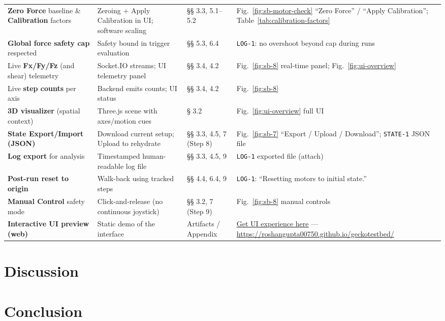 \documentclass[
    twocolumn,
    fontsize = 10pt,
    parskip = half+,
    headings = small,
    headwidth = text,
    footwidth = text,
]{scrartcl}
\begin{document}
\begin{table}[t]
\begin{tabularx}{\textwidth}{@{}p{}YYY@{}}
\textbf{Zero Force} baseline \& \textbf{Calibration} factors
& Zeroing + Apply Calibration in UI; software scaling
& §§ 3.3, 5.1–5.2
& Fig.~\ref{fig:sb-motor-check} “Zero Force” / “Apply Calibration”; Table~\ref{tab:calibration-factors} \\
\textbf{Global force safety cap} respected
& Safety bound in trigger evaluation
& §§ 5.3, 6.4
& \texttt{LOG-1}: no overshoot beyond cap during runs \\
Live \textbf{Fx/Fy/Fz} (and shear) telemetry
& Socket.IO streams; UI telemetry panel
& §§ 3.4, 4.2
& Fig.~\ref{fig:sb-8} real-time panel; Fig.~\ref{fig:ui-overview} \\
Live \textbf{step counts} per axis
& Backend emits counts; UI status
& §§ 3.4, 4.2
& Fig.~\ref{fig:sb-8} \\
\textbf{3D visualizer} (spatial context)
& Three.js scene with axes/motion cues
& § 3.2
& Fig.~\ref{fig:ui-overview} full UI \\
\textbf{State Export/Import (JSON)}
& Download current setup; Upload to rehydrate
& §§ 3.3, 4.5, 7 (Step 8)
& Fig.~\ref{fig:sb-7} “Export / Upload / Download”; \texttt{STATE-1} JSON file \\
\textbf{Log export} for analysis
& Timestamped human-readable log file
& §§ 3.3, 4.5, 9
& \texttt{LOG-1} exported file (attach) \\
\textbf{Post-run reset to origin}
& Walk-back using tracked steps
& §§ 4.4, 6.4, 9
& \texttt{LOG-1}: “Resetting motors to initial state.” \\
\textbf{Manual Control} safety mode
& Click-and-release (no continuous joystick)
& §§ 3.2, 7 (Step 9)
& Fig.~\ref{fig:sb-8} manual controls \\
\textbf{Interactive UI preview (web)}
& Static demo of the interface
& Artifacts / Appendix
& \href{https://roshangupta00750.github.io/geckotestbed/}{Get UI experience here} — \url{https://roshangupta00750.github.io/geckotestbed/} \\
\bottomrule
\end{tabularx}
\end{table}



\section{Discussion}


\section{Conclusion}

\printbibliography

\printglossaries
\appendix
{}

\end{document}
